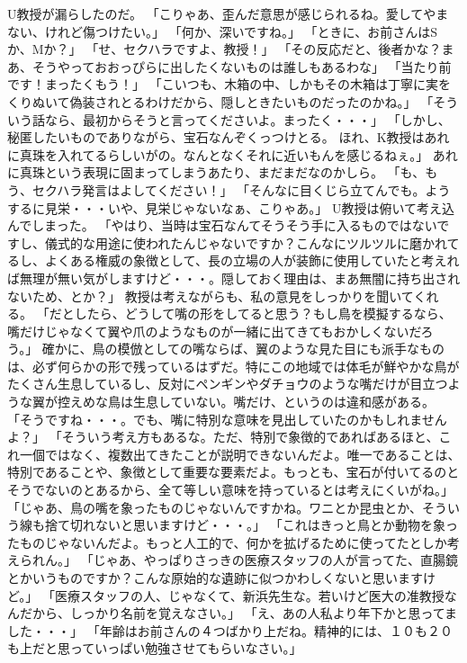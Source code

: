 U教授が漏らしたのだ。
「こりゃあ、歪んだ意思が感じられるね。愛してやまない、けれど傷つけたい。」
「何か、深いですね。」
「ときに、お前さんはSか、Mか？」
「せ、セクハラですよ、教授！」
「その反応だと、後者かな？まあ、そうやっておおっぴらに出したくないものは誰しもあるわな」
「当たり前です！まったくもう！」
「こいつも、木箱の中、しかもその木箱は丁寧に実をくりぬいて偽装されとるわけだから、隠しときたいものだったのかね。」
「そういう話なら、最初からそうと言ってくださいよ。まったく・・・」
「しかし、秘匿したいものでありながら、宝石なんぞくっつけとる。
ほれ、K教授はあれに真珠を入れてるらしいがの。なんとなくそれに近いもんを感じるねぇ。」
あれに真珠という表現に固まってしまうあたり、まだまだなのかしら。
「も、もう、セクハラ発言はよしてください！」
「そんなに目くじら立てんでも。ようするに見栄・・・いや、見栄じゃないなぁ、こりゃあ。」
U教授は俯いて考え込んでしまった。
「やはり、当時は宝石なんてそうそう手に入るものではないですし、儀式的な用途に使われたんじゃないですか？こんなにツルツルに磨かれてるし、よくある権威の象徴として、長の立場の人が装飾に使用していたと考えれば無理が無い気がしますけど・・・。隠しておく理由は、まあ無闇に持ち出されないため、とか？」
教授は考えながらも、私の意見をしっかりを聞いてくれる。
「だとしたら、どうして嘴の形をしてると思う？もし鳥を模擬するなら、嘴だけじゃなくて翼や爪のようなものが一緒に出てきてもおかしくないだろう。」
確かに、鳥の模倣としての嘴ならば、翼のような見た目にも派手なものは、必ず何らかの形で残っているはずだ。特にこの地域では体毛が鮮やかな鳥がたくさん生息しているし、反対にペンギンやダチョウのような嘴だけが目立つような翼が控えめな鳥は生息していない。嘴だけ、というのは違和感がある。
「そうですね・・・。でも、嘴に特別な意味を見出していたのかもしれませんよ？」
「そういう考え方もあるな。ただ、特別で象徴的であればあるほと、これ一個ではなく、複数出てきたことが説明できないんだよ。唯一であることは、特別であることや、象徴として重要な要素だよ。もっとも、宝石が付いてるのとそうでないのとあるから、全て等しい意味を持っているとは考えにくいがね。」
「じゃあ、鳥の嘴を象ったものじゃないんですかね。ワニとか昆虫とか、そういう線も捨て切れないと思いますけど・・・。」
「これはきっと鳥とか動物を象ったものじゃないんだよ。もっと人工的で、何かを拡げるために使ってたとしか考えられん。」
「じゃあ、やっぱりさっきの医療スタッフの人が言ってた、直腸鏡とかいうものですか？こんな原始的な遺跡に似つかわしくないと思いますけど。」
「医療スタッフの人、じゃなくて、新浜先生な。若いけど医大の准教授なんだから、しっかり名前を覚えなさい。」
「え、あの人私より年下かと思ってました・・・」
「年齢はお前さんの４つばかり上だね。精神的には、１０も２０も上だと思っていっぱい勉強させてもらいなさい。」
